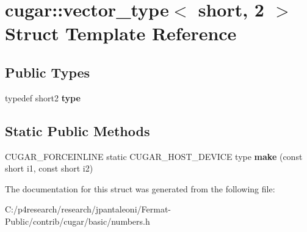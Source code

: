 \hypertarget{structcugar_1_1vector__type_3_01short_00_012_01_4}{}\section{cugar\+:\+:vector\+\_\+type$<$ short, 2 $>$ Struct Template Reference}
\label{structcugar_1_1vector__type_3_01short_00_012_01_4}
\subsection*{Public Types}
\begin{DoxyCompactItemize}
\item 
\mbox{\label{structcugar_1_1vector__type_3_01short_00_012_01_4_a8415a65b2af050dd7be14a48d4833fca}} 
typedef short2 {\bfseries type}
\end{DoxyCompactItemize}
\subsection*{Static Public Methods}
\begin{DoxyCompactItemize}
\item 
\mbox{\label{structcugar_1_1vector__type_3_01short_00_012_01_4_a1c84ba496aeb6d27b0d6a26e9d3e04ea}} 
C\+U\+G\+A\+R\+\_\+\+F\+O\+R\+C\+E\+I\+N\+L\+I\+NE static C\+U\+G\+A\+R\+\_\+\+H\+O\+S\+T\+\_\+\+D\+E\+V\+I\+CE type {\bfseries make} (const short i1, const short i2)
\end{DoxyCompactItemize}


The documentation for this struct was generated from the following file\+:\begin{DoxyCompactItemize}
\item 
C\+:/p4research/research/jpantaleoni/\+Fermat-\/\+Public/contrib/cugar/basic/numbers.\+h\end{DoxyCompactItemize}
